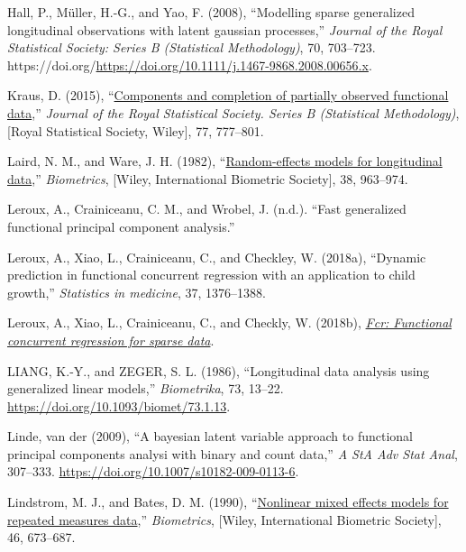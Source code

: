 \documentclass[
  11pt,
]{article}
\newlength{\cslhangindent}
\newlength{\cslentryspacingunit} %
\newenvironment{CSLReferences}[2] %
 {%
  \setlength{\parindent}{0pt}
  \ifodd #1
  \let\oldpar\par
  \def\par{\hangindent=\cslhangindent\oldpar}
  \fi
  \setlength{\parskip}{#2\cslentryspacingunit}
 }%
 {}
\begin{document}
\begin{CSLReferences}{1}{0}
\leavevmode{}%
Hall, P., Müller, H.-G., and Yao, F. (2008), {``Modelling sparse
generalized longitudinal observations with latent gaussian processes,''}
\emph{Journal of the Royal Statistical Society: Series B (Statistical
Methodology)}, 70, 703--723.
https://doi.org/\url{https://doi.org/10.1111/j.1467-9868.2008.00656.x}.

\leavevmode{}%
Kraus, D. (2015),
{``\href{http://www.jstor.org/stable/24775309}{Components and completion
of partially observed functional data},''} \emph{Journal of the Royal
Statistical Society. Series B (Statistical Methodology)}, {[}Royal
Statistical Society, Wiley{]}, 77, 777--801.

\leavevmode{}%
Laird, N. M., and Ware, J. H. (1982),
{``\href{http://www.jstor.org/stable/2529876}{Random-effects models for
longitudinal data},''} \emph{Biometrics}, {[}Wiley, International
Biometric Society{]}, 38, 963--974.

\leavevmode{}%
Leroux, A., Crainiceanu, C. M., and Wrobel, J. (n.d.). {``Fast
generalized functional principal component analysis.''}

\leavevmode{}%
Leroux, A., Xiao, L., Crainiceanu, C., and Checkley, W. (2018a),
{``Dynamic prediction in functional concurrent regression with an
application to child growth,''} \emph{Statistics in medicine}, 37,
1376--1388.

\leavevmode{}%
Leroux, A., Xiao, L., Crainiceanu, C., and Checkly, W. (2018b),
\emph{\href{https://CRAN.R-project.org/package=fcr}{Fcr: Functional
concurrent regression for sparse data}}.

\leavevmode{}%
LIANG, K.-Y., and ZEGER, S. L. (1986), {``Longitudinal data analysis
using generalized linear models,''} \emph{Biometrika}, 73, 13--22.
\url{https://doi.org/10.1093/biomet/73.1.13}.

\leavevmode{}%
Linde, van der (2009), {``A bayesian latent variable approach to
functional principal components analysi with binary and count data,''}
\emph{A StA Adv Stat Anal}, 307--333.
\url{https://doi.org/10.1007/s10182-009-0113-6}.

\leavevmode{}%
Lindstrom, M. J., and Bates, D. M. (1990),
{``\href{http://www.jstor.org/stable/2532087}{Nonlinear mixed effects
models for repeated measures data},''} \emph{Biometrics}, {[}Wiley,
International Biometric Society{]}, 46, 673--687.


\end{CSLReferences}
\end{document}
